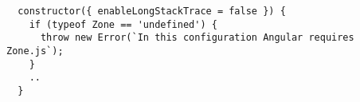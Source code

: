 \begin{verbatim}
  constructor({ enableLongStackTrace = false }) {
    if (typeof Zone == 'undefined') {
      throw new Error(`In this configuration Angular requires Zone.js`);
    }
    ..
  }
\end{verbatim}
